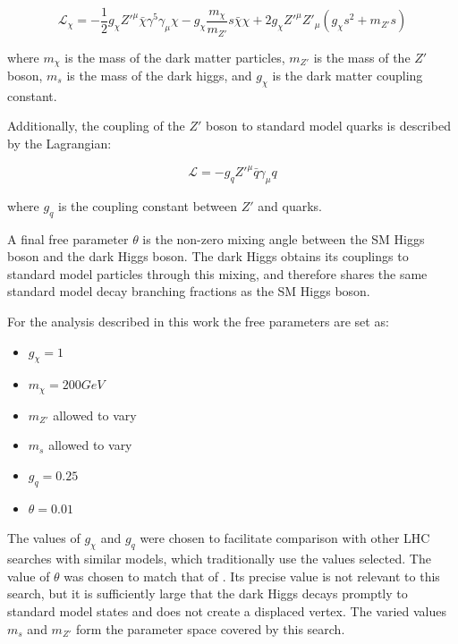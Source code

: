 \begin{equation}
\mathcal{L}_{\chi} = -\frac{1}{2}g_{\chi}Z'^{\mu}\bar{\chi}\gamma^5\gamma_{\mu}\chi - g_{\chi}\frac{m_{\chi}}{m_{Z'}}s\bar{\chi}\chi + 2g_{\chi}Z'^{\mu}Z'_{\mu}(g_{\chi}s^2 + m_{Z'}s)
\end{equation}

where $m_{\chi}$ is the mass of the dark matter particles, $m_{Z'}$ is the mass of the $Z'$ boson, $m_{s}$ is the mass of the dark higgs, and $g_{\chi}$ is the dark matter coupling constant.

Additionally, the coupling of the $Z'$ boson to standard model quarks is described by the Lagrangian:

\begin{equation}
\mathcal{L} = -g_qZ'^{\mu}\bar{q}\gamma_{\mu}q
\end{equation}

where $g_q$ is the coupling constant between $Z'$ and quarks.

A final free parameter $\theta$ is the non-zero mixing angle between the SM Higgs boson and the dark Higgs boson. The dark Higgs obtains its couplings to standard model particles through this mixing, and therefore shares the same standard model decay branching fractions as the SM Higgs boson.

For the analysis described in this work the free parameters are set as:

\begin{itemize}
    \item $g_{\chi} = 1$
    \item $m_{\chi} = 200 GeV$
    \item $m_{Z'}$ allowed to vary
    \item $m_s$ allowed to vary
    \item $g_q = 0.25$
    \item $\theta = 0.01$
\end{itemize}

The values of $g_{\chi}$ and $g_{q}$ were chosen to facilitate comparison with other LHC searches with similar models, which traditionally use the values selected. The value of $\theta$ was chosen to match that of \cite{Hunting}. Its precise value is not relevant to this search, but it is sufficiently large that the dark Higgs decays promptly to standard model states and does not create a displaced vertex. The varied values $m_s$ and $m_{Z'}$ form the parameter space covered by this search.
